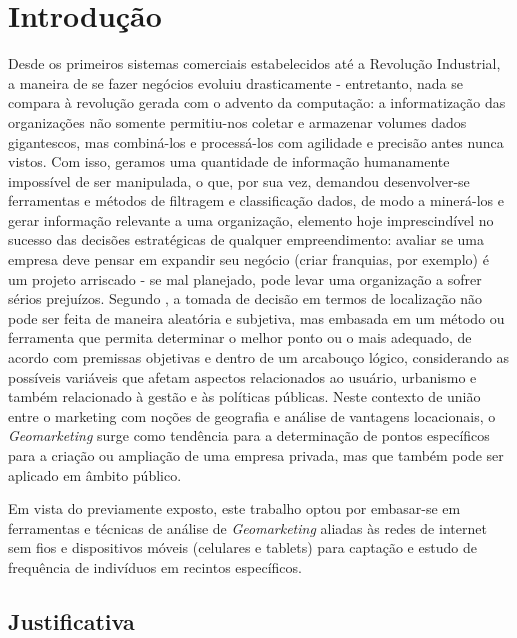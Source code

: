 
\chapter{Introdução}
\label{introducao}

Desde os primeiros sistemas comerciais estabelecidos até a Revolução Industrial, a maneira de se fazer negócios evoluiu drasticamente - entretanto, nada se compara à revolução gerada com o advento da computação: a informatização das organizações não somente permitiu-nos coletar e armazenar volumes dados gigantescos, mas combiná-los e processá-los com agilidade e precisão antes nunca vistos. Com isso, geramos uma quantidade de informação humanamente impossível de ser manipulada, o que, por sua vez, demandou desenvolver-se ferramentas e métodos de filtragem e classificação dados, de modo a minerá-los e gerar informação relevante a uma organização, elemento hoje imprescindível no sucesso das decisões estratégicas de qualquer empreendimento: avaliar se uma empresa deve pensar em expandir seu negócio (criar franquias, por exemplo) é um projeto arriscado - se mal planejado, pode levar uma organização a sofrer sérios prejuízos. Segundo , a tomada de decisão em termos de localização não pode ser feita de maneira aleatória e subjetiva, mas embasada em um método ou ferramenta que permita
determinar o melhor ponto ou o mais adequado, de acordo com premissas objetivas e dentro
de um arcabouço lógico, considerando as possíveis variáveis que afetam aspectos
relacionados ao usuário, urbanismo e também relacionado à gestão e às políticas públicas. Neste contexto de união entre o marketing com noções de geografia e análise de vantagens
locacionais, o \emph{Geomarketing} surge como tendência para a determinação de pontos específicos
para a criação ou ampliação de uma empresa privada, mas que também pode ser aplicado em âmbito público.

Em vista do previamente exposto, este trabalho optou por embasar-se em ferramentas e técnicas de análise de \emph{Geomarketing} aliadas às redes de internet sem fios e dispositivos móveis (celulares e tablets) para captação e estudo de frequência de indivíduos em recintos específicos.

\section{Justificativa}
\label{justificativa}

